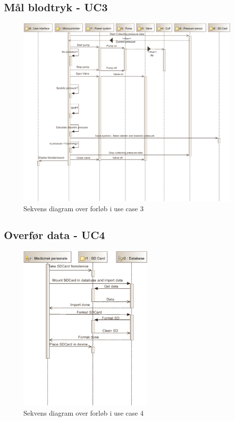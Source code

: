 \subsection{Mål blodtryk - UC3}
\begin{figure}[H]
\includegraphics[width=\textwidth]{SystemArkitektur/pdfs/SD_UC3-crop.pdf}
\caption{Sekvens diagram over forløb i use case 3}
\end{figure}
\newpage

\subsection{Overfør data - UC4}
\begin{figure}[H]
\begin{center}
	\includegraphics[width=0.60\textwidth]{SystemArkitektur/pdfs/SD_UC4-crop.pdf}
	\caption{Sekvens diagram over forløb i use case 4}
\end{center}
\end{figure}

